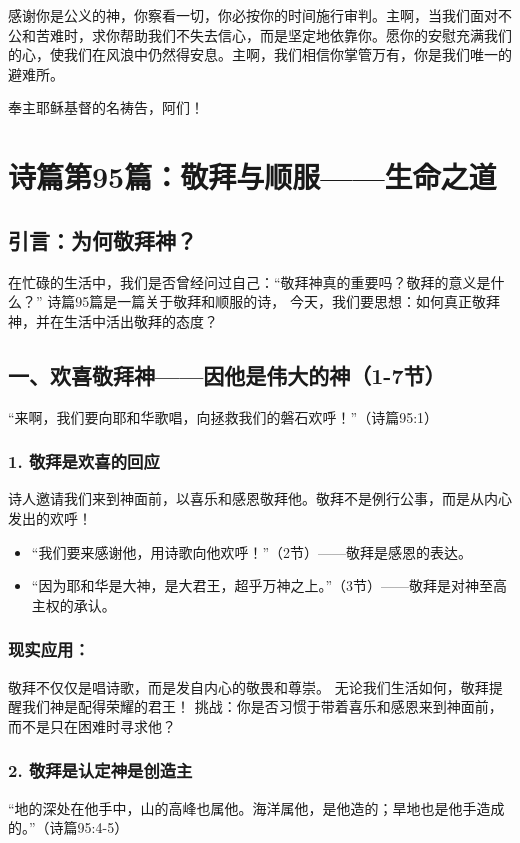 \documentclass[a4paper, 12pt]{article}
\begin{document}
感谢你是公义的神，你察看一切，你必按你的时间施行审判。主啊，当我们面对不公和苦难时，求你帮助我们不失去信心，而是坚定地依靠你。愿你的安慰充满我们的心，使我们在风浪中仍然得安息。主啊，我们相信你掌管万有，你是我们唯一的避难所。

奉主耶稣基督的名祷告，阿们！
\newpage
\section{诗篇第95篇：敬拜与顺服——生命之道}
\subsection*{引言：为何敬拜神？}
在忙碌的生活中，我们是否曾经问过自己：“敬拜神真的重要吗？敬拜的意义是什么？”
诗篇95篇是一篇关于敬拜和顺服的诗，
今天，我们要思想：如何真正敬拜神，并在生活中活出敬拜的态度？

\subsection*{一、欢喜敬拜神——因他是伟大的神（1-7节）}
“来啊，我们要向耶和华歌唱，向拯救我们的磐石欢呼！”（诗篇95:1）

\subsubsection*{1. 敬拜是欢喜的回应}
诗人邀请我们来到神面前，以喜乐和感恩敬拜他。敬拜不是例行公事，而是从内心发出的欢呼！
\begin{itemize}
    \item “我们要来感谢他，用诗歌向他欢呼！”（2节）——敬拜是感恩的表达。

    \item “因为耶和华是大神，是大君王，超乎万神之上。”（3节）——敬拜是对神至高主权的承认。

\end{itemize}
\subsubsection*{现实应用：}

敬拜不仅仅是唱诗歌，而是发自内心的敬畏和尊崇。
无论我们生活如何，敬拜提醒我们神是配得荣耀的君王！
挑战：你是否习惯于带着喜乐和感恩来到神面前，而不是只在困难时寻求他？

\subsubsection*{2. 敬拜是认定神是创造主}
“地的深处在他手中，山的高峰也属他。海洋属他，是他造的；旱地也是他手造成的。”（诗篇95:4-5）
\end{document}
